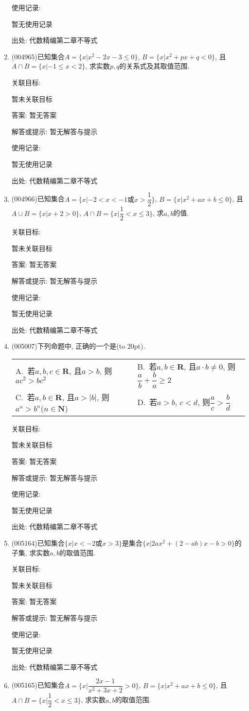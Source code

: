 \documentclass[10pt,a4paper]{article}
\newcommand{\bracket}[1]{(\hbox to #1pt{})}
\newcommand{\twoch}[4]{\par\begin{tabular}{p{.46\textwidth}p{.46\textwidth}}
A.~#1& B.~#2\\
C.~#3& D.~#4
\end{tabular}}
\begin{document}
\begin{enumerate}[1.]
使用记录:

暂无使用记录


出处: 代数精编第二章不等式
\item { (004965)}已知集合$A=\{x|x^2-2x-3\le 0\}$, $B=\{x|x^2+px+q<0\}$, 且$A\cap B=\{x|-1\le x<2\}$, 求实数$p,q$的关系式及其取值范围.


关联目标:

暂未关联目标

答案: 暂无答案

解答或提示: 暂无解答与提示

使用记录:

暂无使用记录


出处: 代数精编第二章不等式
\item { (004966)}已知集合$A=\{x|-2<x<-1\text{或}x>\dfrac 12\}$, $B=\{x|x^2+ax+b\le 0\}$, 且$A\cup B=\{x|x+2>0\}$, $A\cap B=\{x|\dfrac 12<x\le 3\}$, 求$a,b$的值.


关联目标:

暂未关联目标

答案: 暂无答案

解答或提示: 暂无解答与提示

使用记录:

暂无使用记录


出处: 代数精编第二章不等式
\item { (005007)}下列命题中, 正确的一个是\bracket{20}.
\twoch{若$a,b,c\in \mathbf{R}$, 且$a>b$, 则$ac^2>bc^2$}{若$a,b\in \mathbf{R}$, 且$a\cdot b\ne 0$, 则$\dfrac ab+\dfrac ba\ge 2$}{若$a,b\in \mathbf{R}$, 且$a>|b|$, 则$a^n>b^n$($n\in \mathbf{N}$)}{若$a>b$, $c<d$, 则$\dfrac ac>\dfrac bd$}


关联目标:

暂未关联目标

答案: 暂无答案

解答或提示: 暂无解答与提示

使用记录:

暂无使用记录


出处: 代数精编第二章不等式
\item { (005164)}已知集合$\{x|x<-2\text{或}x>3\}$是集合$\{x|2ax^2+(2-ab)x-b>0\}$的子集, 求实数$a,b$的取值范围.


关联目标:

暂未关联目标

答案: 暂无答案

解答或提示: 暂无解答与提示

使用记录:

暂无使用记录


出处: 代数精编第二章不等式
\item { (005165)}已知集合$A=\{x|\dfrac{2x-1}{x^2+3x+2}>0\}$, $B=\{x|x^2+ax+b\le 0\}$, 且$A\cap B=\{x|\dfrac 12<x\le 3\}$, 求实数$a,b$的取值范围.



\end{enumerate}
\end{document}
